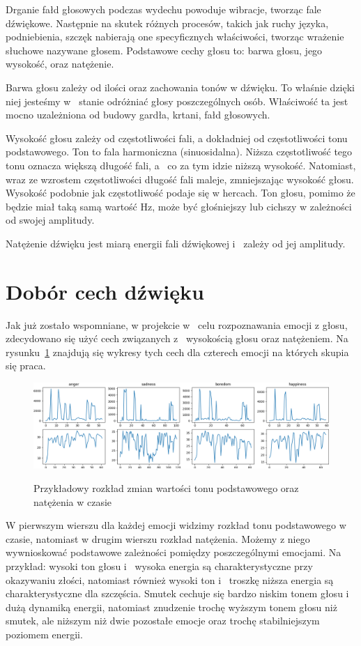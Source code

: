 \documentclass[declaration,shortabstract]{iithesis}
\begin{document}
Drganie fałd głosowych podczas wydechu powoduje wibracje, tworząc fale dźwiękowe. Następnie na skutek różnych procesów, takich jak ruchy języka, podniebienia, szczęk nabierają one specyficznych właściwości, tworząc wrażenie słuchowe nazywane głosem. Podstawowe cechy głosu to: barwa głosu, jego wysokość, oraz natężenie.

Barwa głosu zależy od ilości oraz zachowania tonów w dźwięku. To właśnie dzięki niej jesteśmy w~ stanie odróżniać głosy poszczególnych osób. Właściwość ta jest mocno uzależniona od budowy gardła, krtani, fałd głosowych. 

Wysokość głosu zależy od częstotliwości fali, a dokładniej od częstotliwości tonu podstawowego. Ton to fala harmoniczna (sinuosidalna). Niższa częstotliwość tego tonu oznacza większą długość fali, a~ co za tym idzie niższą wysokość. Natomiast, wraz ze wzrostem częstotliwości długość fali maleje, zmniejszając wysokość głosu. Wysokość podobnie jak częstotliwość podaje się w hercach. Ton głosu, pomimo że będzie miał taką samą wartość Hz, może być głośniejszy lub cichszy w zależności od swojej amplitudy. 

Natężenie dźwięku jest miarą energii fali dźwiękowej i~ zależy od jej amplitudy.

\section{Dobór cech dźwięku}
Jak już zostało wspomniane, w projekcie w~ celu rozpoznawania emocji z głosu, zdecydowano się użyć cech związanych z~ wysokością głosu oraz natężeniem. Na rysunku~\ref{wyk_emo} znajdują się wykresy tych cech dla czterech emocji na których skupia się praca.

\begin{figure}[!h]
\caption{Przykładowy rozkład zmian wartości tonu podstawowego oraz natężenia w czasie}
	\includegraphics[scale=0.3]{b01.png}
\label{wyk_emo}
\end{figure}
	
W pierwszym wierszu dla każdej emocji widzimy rozkład tonu podstawowego w czasie, natomiast w drugim wierszu rozkład natężenia. Możemy z niego wywnioskować podstawowe zależności pomiędzy poszczególnymi emocjami. Na przykład: wysoki ton głosu i~ wysoka energia są charakterystyczne  przy okazywaniu złości, natomiast również wysoki ton i~ troszkę niższa energia są charakterystyczne dla szczęścia. Smutek cechuje się bardzo niskim tonem głosu i~ dużą dynamiką energii, natomiast znudzenie trochę wyższym tonem głosu niż smutek, ale niższym niż dwie pozostałe emocje oraz trochę stabilniejszym poziomem energii. 
\end{document}
